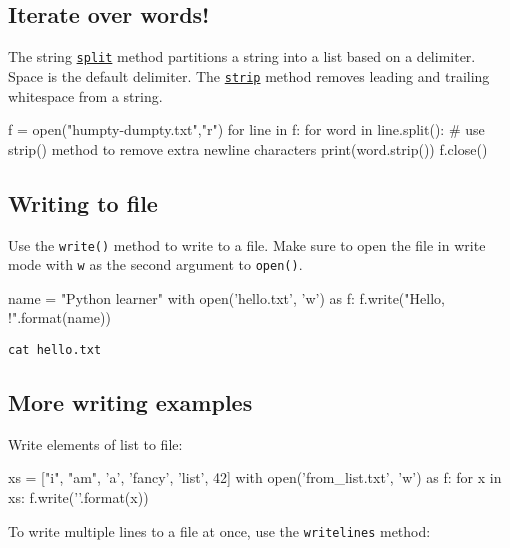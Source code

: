 \documentclass[12pt]{article} \newif\ifsolution\solutiontrue %
\begin{document}
\subsection{Iterate over words!}\label{iterate-over-words}

The string
\href{https://docs.python.org/3/library/stdtypes.html\#str.split}{\texttt{split}}
method partitions a string into a list based on a delimiter. Space is
the default delimiter. The
\href{https://docs.python.org/3/library/stdtypes.html\#str.strip}{\texttt{strip}}
method removes leading and trailing whitespace from a string.

\begin{python}
f = open("humpty-dumpty.txt","r")
for line in f:
    for word in line.split():
        # use strip() method to remove extra newline characters
        print(word.strip())
f.close()
\end{python}

\subsection{Writing to file}\label{writing-to-file}

Use the \texttt{write()} method to write to a file. Make sure to open
the file in write mode with
\texttt{\textquotesingle{}w\textquotesingle{}} as the second argument to
\texttt{open()}.

\begin{python}
name = "Python learner"
with open('hello.txt', 'w') as f:
    f.write("Hello, {}!\n".format(name))
\end{python}

\begin{verbatim}
cat hello.txt
\end{verbatim}

\subsection{More writing examples}\label{more-writing-examples}

Write elements of list to file:

\begin{python}
xs = ["i", "am", 'a', 'fancy', 'list', 42]
with open('from_list.txt', 'w') as f:
    for x in xs:
        f.write('{}\n'.format(x))
\end{python}

To write multiple lines to a file at once, use the \texttt{writelines}
method:
\end{document}
